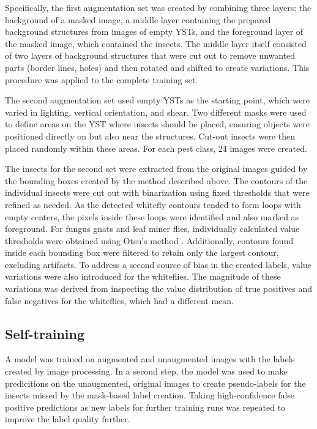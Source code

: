 \documentclass[12pt, a4paper]{article}
\begin{document}
Specifically, the first augmentation set was created by combining three layers: the background of a masked image, a middle layer containing the prepared background structures from images of empty YSTs, and the foreground layer of the masked image, which contained the insects. The middle layer itself consisted of two layers of background structures that were cut out to remove unwanted parts (border lines, holes) and then rotated and shifted to create variations. This procedure was applied to the complete training set.

The second augmentation set used empty YSTs as the starting point, which were varied in lighting, vertical orientation, and shear. Two different masks were used to define areas on the YST where insects should be placed, ensuring objects were positioned directly on but also near the structures. Cut-out insects were then placed randomly within these areas. For each pest class, 24 images were created.

The insects for the second set were extracted from the original images guided by the bounding boxes created by the method described above. The contours of the individual insects were cut out with binarization using fixed thresholds that were refined as needed. As the detected whitefly contours tended to form loops with empty centers, the pixels inside these loops were identified and also marked as foreground. For fungus gnats and leaf miner flies, individually calculated value thresholds were obtained using Otsu’s method \cite{otsu1979threshold}. Additionally, contours found inside each bounding box were filtered to retain only the largest contour, excluding artifacts. To address a second source of bias in the created labels, value variations were also introduced for the whiteflies. The magnitude of these variations was derived from inspecting the value distribution of true positives and false negatives for the whiteflies, which had a different mean.

\subsection{Self-training}
\label{sec:self_training_methods}
A model was trained on augmented and unaugmented images with the labels created by image processing. In a second step, the model was used to make predicitions on the unaugmented, original images to create pseudo-labels for the insects missed by the mask-based label creation. Taking high-confidence false positive predictions as new labels for further training runs was repeated to improve the label quality further.
\end{document}
